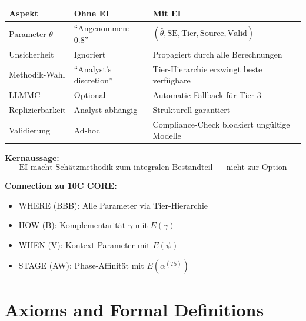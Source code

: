 \begin{tcolorbox}[colback=green!5!white, colframe=green!75!black,
    title=\textbf{Zusammenfassung: Von Optional zu Omnipräsent}]

\renewcommand{\arraystretch}{1.3}
\begin{tabular}{@{}p{4cm}p{4cm}p{4cm}@{}}
\toprule
\textbf{Aspekt} & \textbf{Ohne EI} & \textbf{Mit EI} \\
\midrule
Parameter $\theta$ & ``Angenommen: 0.8'' & $(\hat{\theta}, \text{SE}, \text{Tier}, \text{Source}, \text{Valid})$ \\
Unsicherheit & Ignoriert & Propagiert durch alle Berechnungen \\
Methodik-Wahl & ``Analyst's discretion'' & Tier-Hierarchie erzwingt beste verfügbare \\
LLMMC & Optional & Automatic Fallback für Tier 3 \\
Replizierbarkeit & Analyst-abhängig & Strukturell garantiert \\
Validierung & Ad-hoc & Compliance-Check blockiert ungültige Modelle \\
\bottomrule
\end{tabular}

\medskip
\textbf{Kernaussage:}
\begin{equation*}
\boxed{\text{EI macht Schätzmethodik zum integralen Bestandteil --- nicht zur Option}}
\end{equation*}

\textbf{Connection zu 10C CORE:}
\begin{itemize}[nosep]
    \item WHERE (BBB): Alle Parameter via Tier-Hierarchie
    \item HOW (B): Komplementarität $\gamma$ mit $E(\gamma)$
    \item WHEN (V): Kontext-Parameter mit $E(\psi)$
    \item STAGE (AW): Phase-Affinität mit $E(\alpha^{(T5)})$
\end{itemize}

\end{tcolorbox}


\section{Axioms and Formal Definitions}
\label{sec:hhh-axioms}

